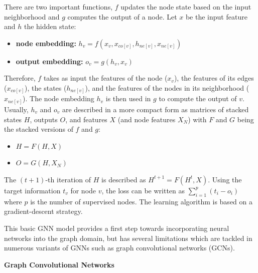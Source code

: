 \documentclass[a4paper,preprint]{sig-alternate}
\begin{document}
There are two important functions, $f$ updates the node state based on the input neighborhood and $g$ computes the output of a node.
Let $x$ be the input feature and $h$ the hidden state:
\begin{itemize}
    \item \textbf{node embedding:} $h_v = f(x_v, x_{co[v]}, h_{ne[v]}, x_{ne[v]})$
    \item \textbf{output embedding:} $o_v = g(h_v, x_v)$
\end{itemize}

Therefore, $f$ takes as input the features of the node ($x_v$), the features of its edges ($x_{co[v]}$), the states ($h_{ne[v]}$),
and the features of the nodes in its neighborhood ($x_{ne[v]}$). The node embedding $h_v$ is then used in $g$ to compute the output of $v$.
Usually, $h_v$ and $o_v$ are described in a more compact form as matrices of stacked states $H$,
outputs $O$, and features $X$ (and node features $X_N$) with $F$ and $G$ being the stacked versions of $f$ and $g$:

\begin{itemize}
    \item $H = F(H, X)$
    \item $O = G(H, X_N)$
\end{itemize}

The $(t + 1)$-th iteration of $H$ is described as $H^{t + 1} = F(H^t, X)$.
Using the target information $t_v$ for node $v$, the loss can be written as $\sum_{i=1}^p (t_i - o_i)$
where $p$ is the number of supervised nodes. The learning algorithm is based on a gradient-descent strategy.\newline

\vfill
\pagebreak

This basic GNN model provides a first step towards incorporating neural networks into the graph domain, 
but has several limitations \cite{Liu_2020} which are tackled in numerous variants of GNNs such as graph convolutional networks (GCNs).\newline

\textbf{Graph Convolutional Networks}\newline
\end{document}
